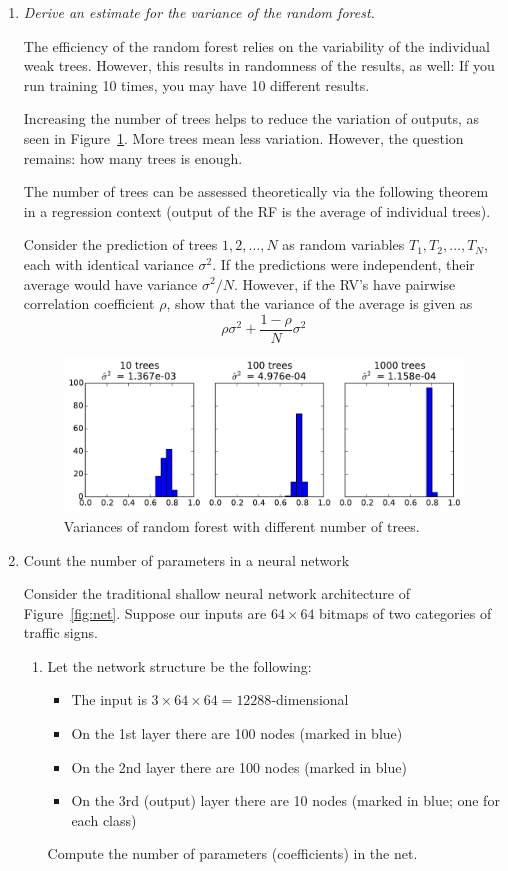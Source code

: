\documentclass[a4paper,12pt]{scrartcl}
\newcommand{\pen}{{\fbox{\texttt{\bfseries pen\&paper}}\quad}}
\begin{document}
\begin{enumerate}

\item \pen \emph{Derive an estimate for the variance of the random forest.}

The efficiency of the random forest relies on the variability of the
individual weak trees. However, this results in randomness of the
results, as well: If you run training 10 times, you may have 10
different results.

Increasing the number of trees helps to reduce the variation of outputs,
as seen in Figure~\ref{fig:variances}. More trees mean less variation.
However, the question remains: how many trees is enough.

The number of trees can be assessed theoretically via the following
theorem in a regression context (output of the RF is the average of
individual trees).

Consider the prediction of trees $1,2,\ldots, N$ as random variables
$T_1, T_2,\ldots, T_N$, each with identical variance $\sigma^2$. 
If the predictions were independent, their average would have variance
$\sigma^2/N$. However, if the RV's have pairwise correlation coefficient
$\rho$, show that the variance of the average is given as
\[
\rho\sigma^2 + \frac{1-\rho}{N}\sigma^2
\]


\begin{figure}[b]%
\centerline{\includegraphics[width=0.6\columnwidth]{Variances.pdf}}%
\caption{Variances of random forest with different number of trees.}%
\label{fig:variances}%
\end{figure}

\eject

\item \pen {Count the number of parameters in a neural network}

Consider the traditional shallow neural network architecture 
of Figure~\ref{fig:net}. Suppose our inputs are $64\times 64$
bitmaps of two categories of traffic signs.
\begin{enumerate}
\item Let the network structure be the following:
\begin{itemize}
	\item The input is $3\times 64\times 64 = 12288$-dimensional
	\item On the 1st layer there are 100 nodes (marked in blue)
	\item On the 2nd layer there are 100 nodes (marked in blue)
	\item On the 3rd (output) layer there are 10 nodes (marked in blue; one for each class)
\end{itemize}
Compute the number of parameters (coefficients) in the net.


\end{enumerate}
\end{enumerate}
\end{document}

